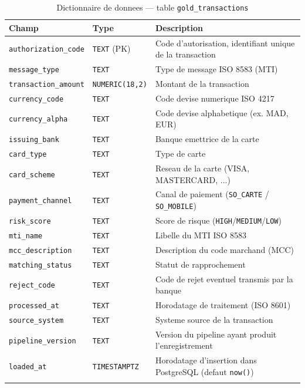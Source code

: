 \begin{longtable}{@{} l l p{6.2cm} @{}}
\toprule
\textbf{Champ} & \textbf{Type} & \textbf{Description} \\
\midrule
\endhead
\texttt{authorization\_code} & \texttt{TEXT} (PK) & Code d'autorisation, identifiant unique de la transaction \\
\texttt{message\_type} & \texttt{TEXT} & Type de message ISO 8583 (MTI) \\
\texttt{transaction\_amount} & \texttt{NUMERIC(18,2)} & Montant de la transaction \\
\texttt{currency\_code} & \texttt{TEXT} & Code devise numerique ISO 4217 \\
\texttt{currency\_alpha} & \texttt{TEXT} & Code devise alphabetique (ex. MAD, EUR) \\
\texttt{issuing\_bank} & \texttt{TEXT} & Banque emettrice de la carte \\
\texttt{card\_type} & \texttt{TEXT} & Type de carte \\
\texttt{card\_scheme} & \texttt{TEXT} & Reseau de la carte (VISA, MASTERCARD, ...) \\
\texttt{payment\_channel} & \texttt{TEXT} & Canal de paiement (\texttt{SO\_CARTE} / \texttt{SO\_MOBILE}) \\
\texttt{risk\_score} & \texttt{TEXT} & Score de risque (\texttt{HIGH}/\texttt{MEDIUM}/\texttt{LOW}) \\
\texttt{mti\_name} & \texttt{TEXT} & Libelle du MTI ISO 8583 \\
\texttt{mcc\_description} & \texttt{TEXT} & Description du code marchand (MCC) \\
\texttt{matching\_status} & \texttt{TEXT} & Statut de rapprochement \\
\texttt{reject\_code} & \texttt{TEXT} & Code de rejet eventuel transmis par la banque \\
\texttt{processed\_at} & \texttt{TEXT} & Horodatage de traitement (ISO 8601) \\
\texttt{source\_system} & \texttt{TEXT} & Systeme source de la transaction \\
\texttt{pipeline\_version} & \texttt{TEXT} & Version du pipeline ayant produit l'enregistrement \\
\texttt{loaded\_at} & \texttt{TIMESTAMPTZ} & Horodatage d'insertion dans PostgreSQL (defaut \texttt{now()}) \\
\bottomrule
\caption{Dictionnaire de donnees --- table \texttt{gold\_transactions}}
\label{tab:dictionnaire}
\end{longtable}

